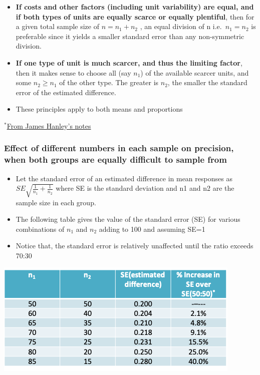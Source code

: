 \documentclass[
]{book}
\providecommand{\tightlist}{%
  \setlength{\itemsep}{0pt}\setlength{\parskip}{0pt}}
\begin{document}
\begin{itemize}
\tightlist
\item
  \textbf{If costs and other factors (including unit variability) are equal, and if both types of units are equally scarce or equally plentiful}, then for a given total sample size of \(n = n_1 + n_2\) , an equal division of n i.e.~\(n_1 = n_2\) is preferable since it yields a smaller standard error than any non-symmetric division.
\item
  \textbf{If one type of unit is much scarcer, and thus the limiting factor}, then it makes sense to choose all (say \(n_1\)) of the available scarcer units, and some \(n_2 \geq n_1\) of the other type. The greater is \(n_2\), the smaller the standard error of the estimated difference.
\item
  These principles apply to both means and proportions
\end{itemize}

\(^*\)\href{http://www.medicine.mcgill.ca/epidemiology/hanley/bios601/Mean-Quantile/2\%20MeansQuantitativeVariable.pdf}{From James Hanley's notes}

\hypertarget{effect-of-different-numbers-in-each-sample-on-precision-when-both-groups-are-equally-difficult-to-sample-from-1}{%
\subsubsection{Effect of different numbers in each sample on precision, when both groups are equally difficult to sample from}\label{effect-of-different-numbers-in-each-sample-on-precision-when-both-groups-are-equally-difficult-to-sample-from-1}}

\begin{itemize}
\tightlist
\item
  Let the standard error of an estimated difference in mean responses as \(SE\sqrt{\frac{1}{n_1}+\frac{1}{n_2}}\) where SE is the standard deviation and n1 and n2 are the sample size in each group.
\item
  The following table gives the value of the standard error (SE) for various combinations of \(n_1\) and \(n_2\) adding to 100 and assuming SE=1
\item
  Notice that, the standard error is relatively unaffected until the ratio exceeds 70:30
\end{itemize}

\includegraphics[width=0.5\linewidth]{./4_75}
\end{document}
